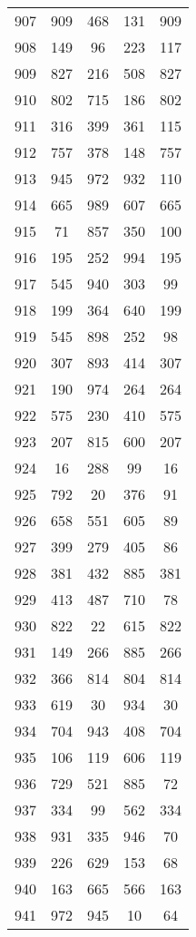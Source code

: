 \documentclass[a4paper,10pt,ngerman]{scrartcl}
\begin{document}
\begin{longtable}[c]{c|c|c|c|c}
    907 & 909 & 468 & 131 & 909 \\
    908 & 149 & 96 & 223 & 117 \\
    909 & 827 & 216 & 508 & 827 \\
    910 & 802 & 715 & 186 & 802 \\
    911 & 316 & 399 & 361 & 115 \\
    912 & 757 & 378 & 148 & 757 \\
    913 & 945 & 972 & 932 & 110 \\
    914 & 665 & 989 & 607 & 665 \\
    915 & 71 & 857 & 350 & 100 \\
    916 & 195 & 252 & 994 & 195 \\
    917 & 545 & 940 & 303 & 99 \\
    918 & 199 & 364 & 640 & 199 \\
    919 & 545 & 898 & 252 & 98 \\
    920 & 307 & 893 & 414 & 307 \\
    921 & 190 & 974 & 264 & 264 \\
    922 & 575 & 230 & 410 & 575 \\
    923 & 207 & 815 & 600 & 207 \\
    924 & 16 & 288 & 99 & 16 \\
    925 & 792 & 20 & 376 & 91 \\
    926 & 658 & 551 & 605 & 89 \\
    927 & 399 & 279 & 405 & 86 \\
    928 & 381 & 432 & 885 & 381 \\
    929 & 413 & 487 & 710 & 78 \\
    930 & 822 & 22 & 615 & 822 \\
    931 & 149 & 266 & 885 & 266 \\
    932 & 366 & 814 & 804 & 814 \\
    933 & 619 & 30 & 934 & 30 \\
    934 & 704 & 943 & 408 & 704 \\
    935 & 106 & 119 & 606 & 119 \\
    936 & 729 & 521 & 885 & 72 \\
    937 & 334 & 99 & 562 & 334 \\
    938 & 931 & 335 & 946 & 70 \\
    939 & 226 & 629 & 153 & 68 \\
    940 & 163 & 665 & 566 & 163 \\
    941 & 972 & 945 & 10 & 64 \\

\end{longtable}
\end{document}
